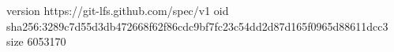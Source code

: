 version https://git-lfs.github.com/spec/v1
oid sha256:3289c7d55d3db472668f62f86cdc9bf7fc23c54dd2d87d165f0965d88611dcc3
size 6053170
